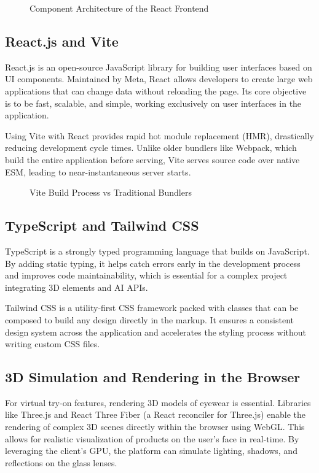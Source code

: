 \begin{figure}[H]
    \centering
    \vspace{8cm}
    \caption{Component Architecture of the React Frontend}
    \label{fig:react_architecture}
\end{figure}

\subsection{React.js and Vite}
React.js is an open-source JavaScript library for building user interfaces based on UI components. Maintained by Meta, React allows developers to create large web applications that can change data without reloading the page. Its core objective is to be fast, scalable, and simple, working exclusively on user interfaces in the application.

Using Vite with React provides rapid hot module replacement (HMR), drastically reducing development cycle times. Unlike older bundlers like Webpack, which build the entire application before serving, Vite serves source code over native ESM, leading to near-instantaneous server starts.

\begin{figure}[H]
    \centering
    \vspace{8cm}
    \caption{Vite Build Process vs Traditional Bundlers}
    \label{fig:vite_build}
\end{figure}

\subsection{TypeScript and Tailwind CSS}
TypeScript is a strongly typed programming language that builds on JavaScript. By adding static typing, it helps catch errors early in the development process and improves code maintainability, which is essential for a complex project integrating 3D elements and AI APIs. 

Tailwind CSS is a utility-first CSS framework packed with classes that can be composed to build any design directly in the markup. It ensures a consistent design system across the application and accelerates the styling process without writing custom CSS files.

\subsection{3D Simulation and Rendering in the Browser}
For virtual try-on features, rendering 3D models of eyewear is essential. Libraries like Three.js and React Three Fiber (a React reconciler for Three.js) enable the rendering of complex 3D scenes directly within the browser using WebGL. This allows for realistic visualization of products on the user's face in real-time. By leveraging the client's GPU, the platform can simulate lighting, shadows, and reflections on the glass lenses.


